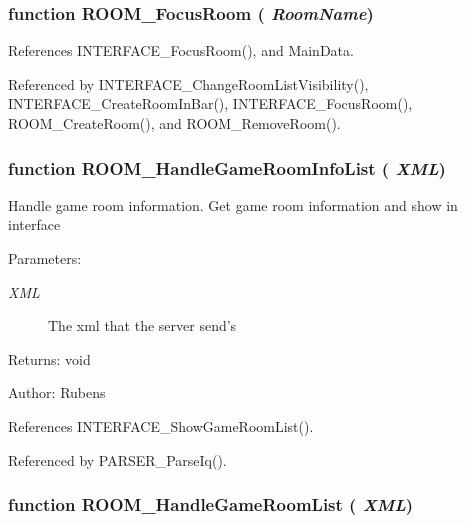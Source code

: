 \subsubsection{\setlength{\rightskip}{0pt plus 5cm}function ROOM\_\-FocusRoom ( {\em RoomName})}\label{room_2room_8js_6710c024c97239b27d3f4062572293df}




References INTERFACE\_\-FocusRoom(), and MainData.

Referenced by INTERFACE\_\-ChangeRoomListVisibility(), INTERFACE\_\-CreateRoomInBar(), INTERFACE\_\-FocusRoom(), ROOM\_\-CreateRoom(), and ROOM\_\-RemoveRoom().
\subsubsection{\setlength{\rightskip}{0pt plus 5cm}function ROOM\_\-HandleGameRoomInfoList ( {\em XML})}\label{room_2room_8js_e88940f31ea79698692d9fcbf49e04bf}


Handle game room information. Get game room information and show in interface

\begin{Desc}
\item[Parameters:]
\begin{description}
\item[{\em XML}]The xml that the server send's \end{description}
\end{Desc}
\begin{Desc}
\item[Returns:]void \end{Desc}
\begin{Desc}
\item[Author:]Rubens \end{Desc}


References INTERFACE\_\-ShowGameRoomList().

Referenced by PARSER\_\-ParseIq().
\subsubsection{\setlength{\rightskip}{0pt plus 5cm}function ROOM\_\-HandleGameRoomList ( {\em XML})}\label{room_2room_8js_f43a3c28cfd25e8118cc5f8f469b27c3}


